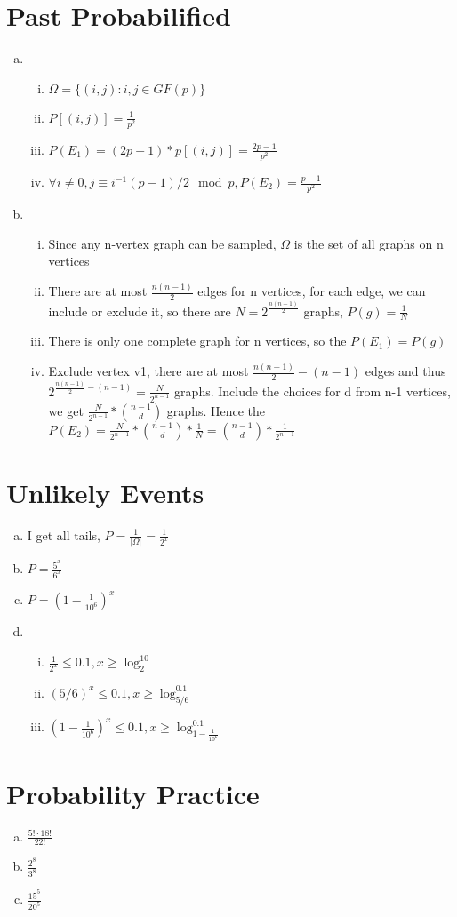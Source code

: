 \documentclass{article}
\begin{document}
\part*{Past Probabilified}
\begin{enumerate}[(a)]
    \item 
    \begin{enumerate}[(i)]
        \item $\Omega = \{(i,j): i,j \in GF(p)\}$
        \item $P[(i,j)] = \frac{1}{p^2}$
        \item $P(E_1) = (2p-1) * p[(i,j)] = \frac{2p-1}{p^2}$
        \item $\forall i \not= 0, j \equiv i^{-1}(p-1)/2 \mod{p}, P(E_2) = \frac{p-1}{p^2}$
    \end{enumerate}
    \item 
    \begin{enumerate}[(i)]
        \item Since any n-vertex graph can be sampled, $\Omega$ is the set of all graphs on n vertices
        \item There are at most $\frac{n(n-1)}{2}$ edges for n vertices, for each edge, we can include or exclude it, 
        so there are $N = 2^{\frac{n(n-1)}{2}}$ graphs, $P(g) = \frac{1}{N}$
        \item There is only one complete graph for n vertices, so the $P(E_1) = P(g)$
        \item Exclude vertex v1, there are at most $\frac{n(n-1)}{2} - (n-1)$ edges and thus 
        $2^{\frac{n(n-1)}{2} - (n-1)} = \frac{N}{2^{n-1}}$ graphs. Include the choices for d from n-1 vertices, 
        we get $\frac{N}{2^{n-1}} * \binom{n-1}{d}$ graphs. 
        Hence the $P(E_2) = \frac{N}{2^{n-1}} * \binom{n-1}{d} * \frac{1}{N} = \binom{n-1}{d} * \frac{1}{2^{n-1}}$
    \end{enumerate}
\end{enumerate}

\part*{Unlikely Events}
\begin{enumerate}[(a)]
    \item I get all tails, $P = \frac{1}{|\Omega|} = \frac{1}{2^x}$
    \item $P = \frac{5^x}{6^x}$
    \item $P = (1-\frac{1}{10^6})^x$
    \item \begin{enumerate}[(i)]
        \item $\frac{1}{2^x} \le 0.1, x \ge \log_2^{10}$
        \item $(5/6)^x \le 0.1, x \ge \log_{5/6}^{0.1}$
        \item $(1-\frac{1}{10^6})^x \le 0.1, x \ge \log_{1-\frac{1}{10^6}}^{0.1}$
    \end{enumerate}
\end{enumerate}

\part*{Probability Practice}
\begin{enumerate}[(a)]
    \item $\frac{5!\cdot 18!}{22!}$
    \item $\frac{2^8}{3^8}$
    \item $\frac{15^5}{20^5}$
\end{enumerate}
\end{document}
